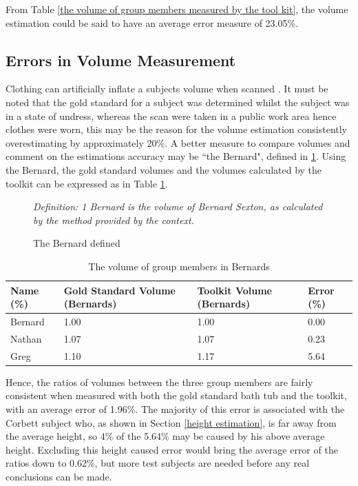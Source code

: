 From Table \ref{the volume of group members measured by the tool kit}, the volume estimation could be said to have an average error measure of 23.05\%.

\subsection{Errors in Volume Measurement}
\label{errors in volume measurement}
Clothing can artificially inflate a subjects volume when scanned \cite{shafer2008}. It must be noted that the gold standard for a subject was determined whilst the subject was in a state of undress, whereas the scan were taken in a public work area hence clothes were worn, this may be the reason for the volume estimation consistently overestimating by approximately 20\%. A better measure to compare volumes and comment on the estimations accuracy may be ``the Bernard", defined in \ref{the bernard defined}. Using the Bernard, the gold standard volumes and the volumes calculated by the toolkit can be expressed as in Table \ref{The volume of group members in bernards}.\\

\begin{figure}[!htb]
\begin{center}
  \textit{Definition: 1 Bernard is the volume of Bernard Sexton, as calculated by the method provided by the context.}
\end{center}
\caption{The Bernard defined}
\label{the bernard defined}
\end{figure}

\begin{table}[!htb]
\begin{center}
  \begin{tabular}{| l | p{4cm} | p{3cm} | p{2cm} |}
    \hline
    Name (\%) & Gold Standard Volume (Bernards) & Toolkit Volume (Bernards) & Error (\%)\\ \hline
    Bernard & 1.00 & 1.00 & 0.00\\ \hline
    Nathan & 1.07 & 1.07 & 0.23\\ \hline
    Greg & 1.10 & 1.17 & 5.64\\ \hline
  \end{tabular}
\end{center}
\caption{The volume of group members in Bernards}
\label{The volume of group members in bernards}
\end{table}

Hence, the ratios of volumes between the three group members are fairly consistent when measured with both the gold standard bath tub and the toolkit, with an average error of 1.96\%. The majority of this error is associated with the Corbett subject who, as shown in Section \ref{height estimation}, is far away from the average height, so 4\% of the 5.64\% may be caused by his above average height. Excluding this height caused error would bring the average error of the ratios down to 0.62\%, but more test subjects are needed before any real conclusions can be made.\\

